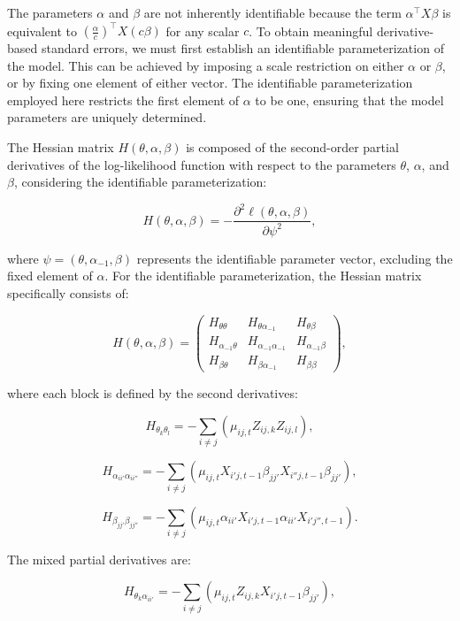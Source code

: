 The parameters $ \alpha $ and $ \beta $ are not inherently identifiable because the term $ \alpha^\top X \beta $ is equivalent to $ \left(\frac{\alpha}{c}\right)^\top X \left(c \beta\right) $ for any scalar $ c $. To obtain meaningful derivative-based standard errors, we must first establish an identifiable parameterization of the model. This can be achieved by imposing a scale restriction on either $ \alpha $ or $ \beta $, or by fixing one element of either vector. The identifiable parameterization employed here restricts the first element of $ \alpha $ to be one, ensuring that the model parameters are uniquely determined.

The Hessian matrix $ H(\theta, \alpha, \beta) $ is composed of the second-order partial derivatives of the log-likelihood function with respect to the parameters $ \theta $, $ \alpha $, and $ \beta $, considering the identifiable parameterization:

\[
H(\theta, \alpha, \beta) = -\frac{\partial^2 \ell(\theta, \alpha, \beta)}{\partial \psi^2},
\]

where $\psi = (\theta, \alpha_{-1}, \beta)$ represents the identifiable parameter vector, excluding the fixed element of $\alpha$. For the identifiable parameterization, the Hessian matrix specifically consists of:

\[
H(\theta, \alpha, \beta) = \begin{pmatrix}
H_{\theta \theta} & H_{\theta \alpha_{-1}} & H_{\theta \beta} \\
H_{\alpha_{-1} \theta} & H_{\alpha_{-1} \alpha_{-1}} & H_{\alpha_{-1} \beta} \\
H_{\beta \theta} & H_{\beta \alpha_{-1}} & H_{\beta \beta}
\end{pmatrix},
\]

where each block is defined by the second derivatives:

\[
H_{\theta_k \theta_l} = -\sum_{i \neq j} \left( \mu_{ij,t} Z_{ij,k} Z_{ij,l} \right),
\]

\[
H_{\alpha_{ii'} \alpha_{ii''}} = -\sum_{i \neq j} \left( \mu_{ij,t} X_{i'j,t-1} \beta_{jj'} X_{i''j,t-1} \beta_{jj'} \right),
\]

\[
H_{\beta_{jj'} \beta_{jj''}} = -\sum_{i \neq j} \left( \mu_{ij,t} \alpha_{ii'} X_{i'j,t-1} \alpha_{ii'} X_{i'j'',t-1} \right).
\]

The mixed partial derivatives are:

\[
H_{\theta_k \alpha_{ii'}} = -\sum_{i \neq j} \left( \mu_{ij,t} Z_{ij,k} X_{i'j,t-1} \beta_{jj'} \right),
\]

